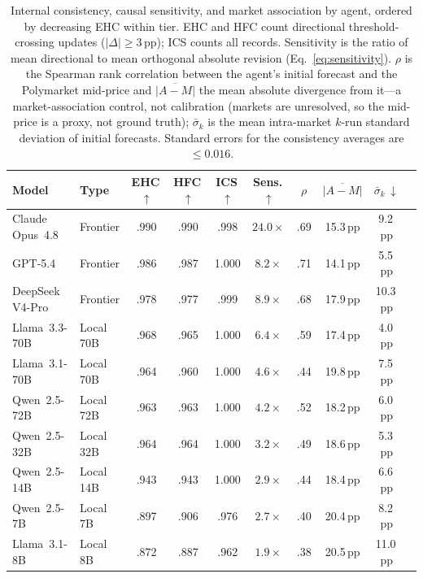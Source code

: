 \begin{table}[t]
\centering
\caption{Internal consistency, causal sensitivity, and market association by agent,
ordered by decreasing EHC within tier.
EHC and HFC count directional threshold-crossing updates ($|\Delta| \geq 3$\,pp);
ICS counts all records.  Sensitivity is the ratio of mean directional to mean
orthogonal absolute revision (Eq.~\ref{eq:sensitivity}).
$\rho$ is the Spearman rank correlation between the agent's initial forecast and the
Polymarket mid-price and $\overline{|A{-}M|}$ the mean absolute divergence from it---a
market-association control, not calibration (markets are unresolved, so the mid-price is a
proxy, not ground truth); $\bar{\sigma}_k$ is the mean intra-market $k$-run standard
deviation of initial forecasts.  Standard errors for the consistency averages are
$\leq 0.016$.}
\label{tab:consistency}
\small
\begin{tabular}{llcccccccc}
\toprule
\textbf{Model} & \textbf{Type}
  & \textbf{EHC}\,$\uparrow$ & \textbf{HFC}\,$\uparrow$ & \textbf{ICS}\,$\uparrow$
  & \textbf{Sens.}\,$\uparrow$ & $\rho$ & $\overline{|A{-}M|}$
  & $\bar{\sigma}_k\,\downarrow$ \\
\midrule
Claude Opus~4.8 & Frontier  &  .990 &  .990 &  .998 & $24.0\times$ & .69 & 15.3\,pp &  9.2\,pp \\
GPT-5.4         & Frontier  &  .986 &  .987 & 1.000 & $8.2\times$  & .71 & 14.1\,pp &  5.5\,pp \\
DeepSeek V4-Pro & Frontier  &  .978 &  .977 &  .999 & $8.9\times$  & .68 & 17.9\,pp & 10.3\,pp \\
\midrule
Llama~3.3-70B   & Local 70B &  .968 &  .965 & 1.000 & $6.4\times$  & .59 & 17.4\,pp &  4.0\,pp \\
Llama~3.1-70B   & Local 70B &  .964 &  .960 & 1.000 & $4.6\times$  & .44 & 19.8\,pp &  7.5\,pp \\
Qwen~2.5-72B    & Local 72B &  .963 &  .963 & 1.000 & $4.2\times$  & .52 & 18.2\,pp &  6.0\,pp \\
Qwen~2.5-32B    & Local 32B &  .964 &  .964 & 1.000 & $3.2\times$  & .49 & 18.6\,pp &  5.3\,pp \\
Qwen~2.5-14B    & Local 14B &  .943 &  .943 & 1.000 & $2.9\times$  & .44 & 18.4\,pp &  6.6\,pp \\
Qwen~2.5-7B     & Local 7B  &  .897 &  .906 &  .976 & $2.7\times$  & .40 & 20.4\,pp &  8.2\,pp \\
Llama~3.1-8B    & Local 8B  &  .872 &  .887 &  .962 & $1.9\times$  & .38 & 20.5\,pp & 11.0\,pp \\
\bottomrule
\end{tabular}
\end{table}

